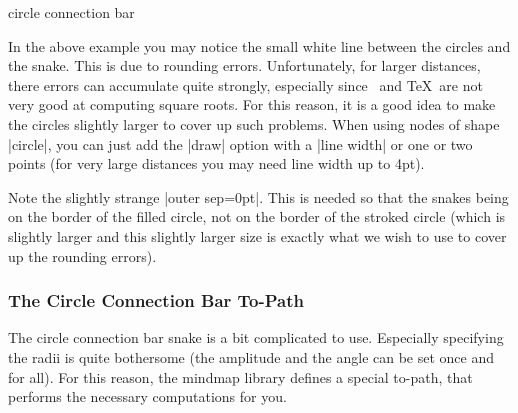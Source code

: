 \begin{snake}{circle connection bar}
\begin{codeexample}[]
\end{codeexample}

  In the above example you may notice the small white line between the
  circles and the snake. This is due to rounding
  errors. Unfortunately, for larger distances, there errors can
  accumulate quite strongly, especially since \tikzname\ and \TeX\ are
  not very good at computing square roots. For this reason, it is a
  good idea to make the circles slightly larger to cover up such
  problems. When using nodes of shape |circle|, you can just add the
  |draw| option with a |line width| or one or two points (for very
  large distances you may need line width up to 4pt). 
\begin{codeexample}[]
\end{codeexample}

  Note the slightly strange |outer sep=0pt|. This is needed so that
  the snakes being on the border of the filled circle, not on the
  border of the stroked circle (which is slightly larger and this
  slightly larger size is exactly what we wish to use to cover up the
  rounding errors).
\end{snake}



\subsubsection{The Circle Connection Bar To-Path}

The circle connection bar snake is a bit complicated to
use. Especially specifying the radii is quite bothersome (the
amplitude and the angle can be set once and for all). For this reason,
the mindmap library defines a special to-path, that performs the
necessary computations for you.

